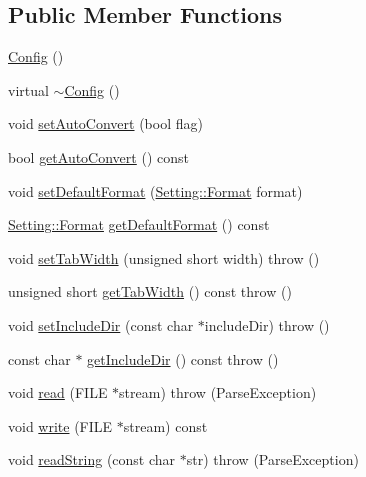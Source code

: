 \subsection*{Public Member Functions}
\begin{DoxyCompactItemize}
\item 
\hyperlink{classlibconfig_1_1Config_ae4e8fa08259da2a1a222e9d04eb42fb1}{Config} ()
\item 
virtual \hyperlink{classlibconfig_1_1Config_a5d94e935833746061f33d58261365f55}{$\sim$\-Config} ()
\item 
void \hyperlink{classlibconfig_1_1Config_aa021f72ce9742f27bf7b5d62c9cb57b5}{set\-Auto\-Convert} (bool flag)
\item 
bool \hyperlink{classlibconfig_1_1Config_a4986e712dd553c3b9f511a98ada42817}{get\-Auto\-Convert} () const 
\item 
void \hyperlink{classlibconfig_1_1Config_ad821267b5bd7e4642040a5fe234dcf15}{set\-Default\-Format} (\hyperlink{classlibconfig_1_1Setting_a35034c3fd8c1b2e8e590b6f53083106e}{Setting\-::\-Format} format)
\item 
\hyperlink{classlibconfig_1_1Setting_a35034c3fd8c1b2e8e590b6f53083106e}{Setting\-::\-Format} \hyperlink{classlibconfig_1_1Config_affc4cebbf4922d05e0bab5a9e3c25c26}{get\-Default\-Format} () const 
\item 
void \hyperlink{classlibconfig_1_1Config_aefc250cedb4d03740e43e734913a05ee}{set\-Tab\-Width} (unsigned short width)  throw ()
\item 
unsigned short \hyperlink{classlibconfig_1_1Config_a49af806089ff70317745e660ac1d5ad4}{get\-Tab\-Width} () const   throw ()
\item 
void \hyperlink{classlibconfig_1_1Config_aa5a069b2d79157f53fde553295ffff37}{set\-Include\-Dir} (const char $\ast$include\-Dir)  throw ()
\item 
const char $\ast$ \hyperlink{classlibconfig_1_1Config_ae4b7acff869245197eed53f800f3fe4f}{get\-Include\-Dir} () const   throw ()
\item 
void \hyperlink{classlibconfig_1_1Config_a468e6ef4c2e36bdd57fc23708dee69a1}{read} (F\-I\-L\-E $\ast$stream)  throw (\-Parse\-Exception)
\item 
void \hyperlink{classlibconfig_1_1Config_a015b1433153ab1a8c5bb05b4bb96dc46}{write} (F\-I\-L\-E $\ast$stream) const 
\item 
void \hyperlink{classlibconfig_1_1Config_af3076c6839fa256bef1ad3fc33e17f98}{read\-String} (const char $\ast$str)  throw (\-Parse\-Exception)
\item 

\end{DoxyCompactItemize}
